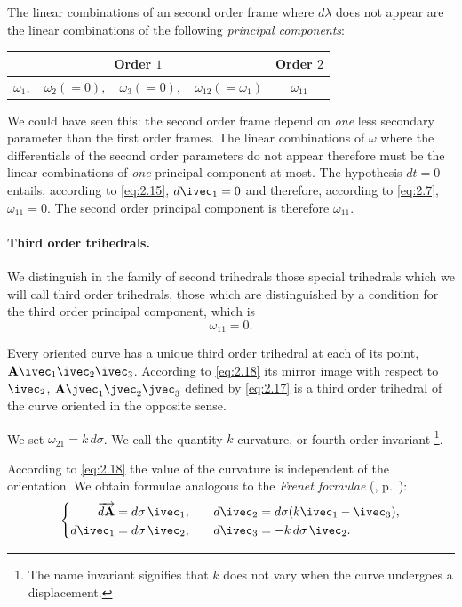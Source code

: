 The linear combinations of an second order frame where $d\lambda$ does not appear are the linear combinations of the following \emph{principal components}:
\begin{center}  
\begin{tabular}{|c|c|}
  \hline
  Order $1$&Order $2$\\
  \hline
  $\omega_{1},\quad\omega_{2}(=0),\quad\omega_{3}(=0),\quad\omega_{12}(=\omega_{1})$&$\omega_{11}$\\
  \hline
\end{tabular}
\end{center}

We could have seen this: the second order frame depend on \emph{one} less secondary parameter than the first order frames. The linear combinations of $\omega$ where the differentials of the second order parameters do not appear therefore must be the linear combinations of \emph{one} principal component at most. The hypothesis $dt=0$ entails, according to \eqref{eq:2.15}, $d\ivec_{1}=0$ and therefore, according to \eqref{eq:2.7}, $\omega_{11}=0$. The second order principal component is therefore $\omega_{11}$.

\paragraph{Third order trihedrals.}
\label{sec:29}
We distinguish in the family of second trihedrals those special trihedrals which we will call third order trihedrals, those which are distinguished by a condition for the third order principal component, which is
\begin{equation}
  \label{eq:2.19}
  \omega_{11}=0.
\end{equation}

Every oriented curve has a unique third order trihedral at each of its point, $\mathbf{A}\ivec_{1}\ivec_{2}\ivec_{3}$. According to \eqref{eq:2.18} its mirror image with respect to $\ivec_{2}$, $\mathbf{A}\jvec_{1}\jvec_{2}\jvec_{3}$ defined by \eqref{eq:2.17} is a third order trihedral of the curve oriented in the opposite sense.

We set $\omega_{21}=k\,d\sigma$. We call the quantity $k$ curvature, or fourth order invariant \footnote{The name invariant signifies that $k$ does not vary when the curve undergoes a displacement.}.

According to \eqref{eq:2.18} the value of the curvature is independent of the orientation. We obtain formulae analogous to the \emph{Frenet formulae} (, p.~\pageref{sec:10}):
\begin{equation}
  \label{eq:2.20}
  \left\{
    \begin{aligned}
      \overrightarrow{d\mathbf{A}}&=d\sigma\,\ivec_{1},&&&d\ivec_{2}&=d\sigma(k\ivec_{1}-\ivec_{3}),\\
      d\ivec_{1}&=d\sigma\,\ivec_{2},&&&d\ivec_{3}&=-k\,d\sigma\,\ivec_{2}.
    \end{aligned}
  \right.
\end{equation}

